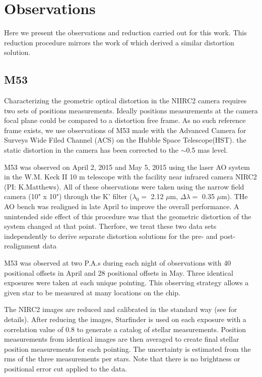 \section{Observations}
Here we present the observations and reduction carried out for this work.  This reduction procedure mirrors the work of \cite{Yelda_2010} which derived a similar distortion solution.  
\subsection{M53}
Characterizing the geometric optical distortion in the NIIRC2 camera requires two sets of positions measurements.  Ideally positions measurements at the camera focal plane could be compared to a distortion free frame.  As no such reference frame exists, we use observations of M53 made with the Advanced Camera for Surveys Wide Filed Channel (ACS) on the Hubble Space Telescope(HST).  the static distortion in the camera has been corrected to the $\sim$0.5 mas level.

M53 was observed on April 2, 2015 and May 5, 2015 using the laser AO system in the W.M. Keck II 10 m telescope with the facility near infrared camera NIRC2 (PI: K.Matthews).  All of these observations were taken using the narrow field camera (10" x 10") through the K' filter ($\lambda_{0} = $ 2.12 $\mu$m, $\Delta\lambda =$ 0.35 $\mu$m).  THe AO bench was realigned  in late April to improve the overall performance.  A unintended side effect of this procedure was that the geometric distortion of the system changed at that point.  Therfore, we treat these two data sets independently to derive separate distortion solutions for the pre- and post- realignment data 

M53 was observed at two P.A.s during each night of observations with 40 positional offsets in April and 28 positional offsets in May.  Three identical exposures were taken at each unique pointing.  This observing strategy allows a given star to be measured at many locations on the chip.

The NIRC2 images are reduced and calibrated in the standard way (see \cite{Yelda_2010} for details).  After reducing the images, Starfinder \citep{Diloatti} is used on each exposure with a correlation value of 0.8 to generate a catalog of stellar measurements.  Position measurements from identical images are then averaged to create final stellar position measurements for each pointing.  The uncertainty is estimated from the rms of the three measurements per stars.  Note that there is no brightness or positional error cut applied to the data.





